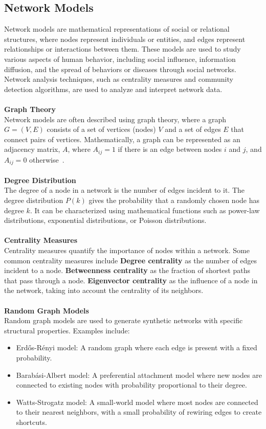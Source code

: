 \documentclass[12pt]{report}
\begin{document}
\subsection{Network Models}\label{nm}
Network models are mathematical representations of social or relational
structures, where nodes represent individuals or entities, and edges
represent relationships or interactions between them. These models are
used to study various aspects of human behavior, including social influence,
information diffusion, and the spread of behaviors or diseases through
social networks. Network analysis techniques, such as centrality measures
and community detection algorithms, are used to analyze and interpret network data.\\
\\
\textbf{Graph Theory}\\
Network models are often described using graph theory,
where a graph \( G = (V, E) \) consists of a set of
vertices (nodes) \( V \) and a set of edges \( E \) that connect pairs
of vertices. Mathematically, a graph can be represented as an adjacency
matrix, \( A \), where \( A_{ij} = 1 \) if there is an edge between
nodes \( i \) and \( j \), and \( A_{ij} = 0 \) otherwise~\cite{bondy2008graph, WOS:000988346000001}.\\
\\
\textbf{Degree Distribution}\\
The degree of a node in a network is the number of edges incident to it.
The degree distribution \( P(k) \) gives the probability that a randomly chosen node
has degree \( k \). It can be characterized using mathematical functions such as power-law
distributions, exponential distributions, or Poisson distributions.\\
\\
\textbf{Centrality Measures}\\
Centrality measures quantify the importance of nodes within a network.
Some common centrality measures include \textbf{Degree centrality} as the number of edges
incident to a node. \textbf{Betweenness centrality} as the fraction of shortest paths that
pass through a node. \textbf{Eigenvector centrality} as the influence of a node in the network,
taking into account the centrality of its neighbors.\\
\\
\textbf{Random Graph Models}\\
Random graph models are used to generate synthetic networks with specific structural
properties. Examples include:\\
\begin{itemize}
   \item Erdős-Rényi model: A random graph where each edge is present with a fixed probability.
   \item Barabási-Albert model: A preferential attachment model where new nodes are connected to existing nodes with probability proportional to their degree.
   \item Watts-Strogatz model: A small-world model where most nodes are connected to their nearest neighbors, with a small probability of rewiring edges to create shortcuts.
\end{itemize}
\end{document}
